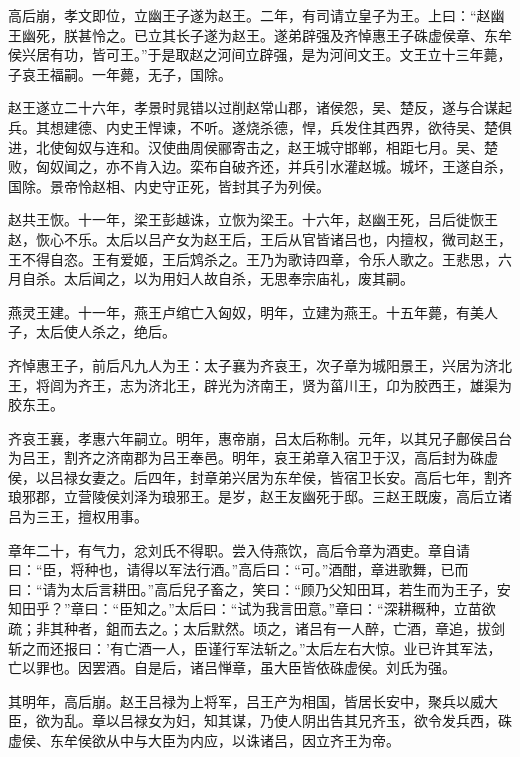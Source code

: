 \documentclass[12pt,UTF8]{ctexbook}
\begin{document}
高后崩，孝文即位，立幽王子遂为赵王。二年，有司请立皇子为王。上曰：“赵幽王幽死，朕甚怜之。已立其长子遂为赵王。遂弟辟强及齐悼惠王子硃虚侯章、东牟侯兴居有功，皆可王。”于是取赵之河间立辟强，是为河间文王。文王立十三年薨，子哀王福嗣。一年薨，无子，国除。



赵王遂立二十六年，孝景时晁错以过削赵常山郡，诸侯怨，吴、楚反，遂与合谋起兵。其想建德、内史王悍谏，不听。遂烧杀德，悍，兵发住其西界，欲待吴、楚俱进，北使匈奴与连和。汉使曲周侯郦寄击之，赵王城守邯郸，相距七月。吴、楚败，匈奴闻之，亦不肯入边。栾布自破齐还，并兵引水灌赵城。城坏，王遂自杀，国除。景帝怜赵相、内史守正死，皆封其子为列侯。



赵共王恢。十一年，梁王彭越诛，立恢为梁王。十六年，赵幽王死，吕后徙恢王赵，恢心不乐。太后以吕产女为赵王后，王后从官皆诸吕也，内擅权，微司赵王，王不得自恣。王有爱姬，王后鸩杀之。王乃为歌诗四章，令乐人歌之。王悲思，六月自杀。太后闻之，以为用妇人故自杀，无思奉宗庙礼，废其嗣。



燕灵王建。十一年，燕王卢绾亡入匈奴，明年，立建为燕王。十五年薨，有美人子，太后使人杀之，绝后。



齐悼惠王子，前后凡九人为王：太子襄为齐哀王，次子章为城阳景王，兴居为济北王，将闾为齐王，志为济北王，辟光为济南王，贤为菑川王，卬为胶西王，雄渠为胶东王。



齐哀王襄，孝惠六年嗣立。明年，惠帝崩，吕太后称制。元年，以其兄子鄜侯吕台为吕王，割齐之济南郡为吕王奉邑。明年，哀王弟章入宿卫于汉，高后封为硃虚侯，以吕禄女妻之。后四年，封章弟兴居为东牟侯，皆宿卫长安。高后七年，割齐琅邪郡，立营陵侯刘泽为琅邪王。是岁，赵王友幽死于邸。三赵王既废，高后立诸吕为三王，擅权用事。



章年二十，有气力，忿刘氏不得职。尝入侍燕饮，高后令章为酒吏。章自请曰：“臣，将种也，请得以军法行酒。”高后曰：“可。”酒酣，章进歌舞，已而曰：“请为太后言耕田。”高后兒子畜之，笑曰：“顾乃父知田耳，若生而为王子，安知田乎？”章曰：“臣知之。”太后曰：“试为我言田意。”章曰：“深耕穊种，立苗欲疏；非其种者，鉏而去之。；太后默然。顷之，诸吕有一人醉，亡酒，章追，拔剑斩之而还报曰：’有亡酒一人，臣谨行军法斩之。”太后左右大惊。业已许其军法，亡以罪也。因罢酒。自是后，诸吕惮章，虽大臣皆依硃虚侯。刘氏为强。



其明年，高后崩。赵王吕禄为上将军，吕王产为相国，皆居长安中，聚兵以威大臣，欲为乱。章以吕禄女为妇，知其谋，乃使人阴出告其兄齐玉，欲令发兵西，硃虚侯、东牟侯欲从中与大臣为内应，以诛诸吕，因立齐王为帝。
\end{document}
